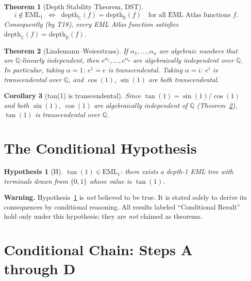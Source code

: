 \documentclass[11pt]{article}
\newtheorem{theorem}{Theorem}
\newtheorem{corollary}[theorem]{Corollary}
\newtheorem{hypothesis}{Hypothesis}
\newcommand{\EML}[1]{\mathrm{EML}_{#1}}
\newcommand{\depthR}{\mathrm{depth}_{\mathbb{R}}}
\newcommand{\depthC}{\mathrm{depth}_{\mathbb{C}}}
\begin{document}
\begin{theorem}[Depth Stability Theorem, DST]\label{thm:DST}
\[
  i \notin \EML{1}
  \;\;\Longleftrightarrow\;\;
  \depthC(f) = \depthR(f)
  \quad\text{for all EML Atlas functions } f.
\]
Consequently (by T18), every EML Atlas function satisfies
$\depthC(f) = \depthR(f)$.
\end{theorem}

\begin{theorem}[Lindemann–Weierstrass]\label{thm:LW}
If $\alpha_1, \ldots, \alpha_n$ are algebraic numbers that are
$\mathbb{Q}$-linearly independent, then $e^{\alpha_1}, \ldots, e^{\alpha_n}$
are algebraically independent over $\mathbb{Q}$.  In particular, taking
$\alpha = 1$: $e^1 = e$ is transcendental.  Taking $\alpha = i$: $e^i$ is
transcendental over $\mathbb{Q}$, and $\cos(1)$, $\sin(1)$ are both
transcendental.
\end{theorem}

\begin{corollary}[tan(1) is transcendental]\label{cor:tan1trans}
Since $\tan(1) = \sin(1)/\cos(1)$ and both $\sin(1)$, $\cos(1)$ are
algebraically independent of $\mathbb{Q}$ (Theorem~\ref{thm:LW}), $\tan(1)$
is transcendental over $\mathbb{Q}$.
\end{corollary}

\section{The Conditional Hypothesis}

\begin{hypothesis}[H]\label{hyp:H}
$\tan(1) \in \EML{1}$: there exists a depth-1 EML tree with terminals
drawn from $\{0,1\}$ whose value is $\tan(1)$.
\end{hypothesis}

\noindent\textbf{Warning.}  Hypothesis~\ref{hyp:H} is \emph{not} believed to be
true.  It is stated solely to derive its consequences by conditional reasoning.
All results labeled ``Conditional Result'' hold only under this hypothesis;
they are \emph{not} claimed as theorems.

\section{Conditional Chain: Steps A through D}
\end{document}
